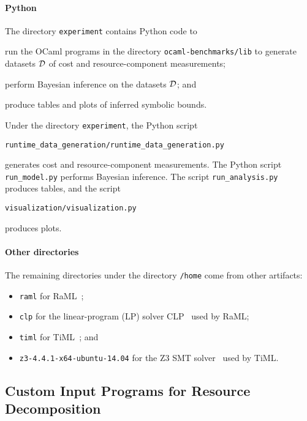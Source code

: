 \paragraph{Python}

The directory \texttt{experiment} contains Python code to
\begin{enumerate*}[label=(\roman*)]
  \item run the OCaml programs in the directory \texttt{ocaml-benchmarks/lib}
        to generate datasets $\mathcal{D}$ of cost and resource-component measurements;
  \item perform Bayesian inference on the datasets $\mathcal{D}$; and
  \item produce tables and plots of inferred symbolic bounds.
\end{enumerate*}
%
Under the directory \texttt{experiment}, the Python script
\begin{verbatim}
runtime_data_generation/runtime_data_generation.py
\end{verbatim}
generates cost and resource-component measurements.
%
The Python script \texttt{run\_model.py} performs Bayesian inference.
%
The script \texttt{run\_analysis.py} produces tables, and the script
\begin{verbatim}
visualization/visualization.py
\end{verbatim}
produces plots.

\paragraph{Other directories}

The remaining directories under the directory \texttt{/home} come from other
artifacts:
\begin{itemize}
  \item \texttt{raml} for RaML~\citep{Hoffmann2017,RaML};
  \item \texttt{clp} for the linear-program (LP) solver CLP~\citep{CLP} used by
        RaML;
  \item \texttt{timl} for TiML~\citep{WangWC17}; and
  \item \texttt{z3-4.4.1-x64-ubuntu-14.04} for the Z3 SMT
        solver~\citep{DeMoura2008} used by TiML.
\end{itemize}

\subsection{Custom Input Programs for Resource Decomposition}

